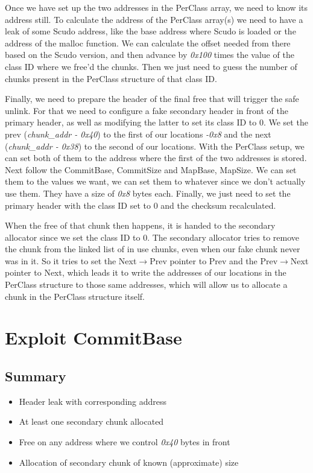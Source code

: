 \documentclass[a4paper,11pt,oneside]{report}
\begin{document}
Once we have set up the two addresses in the PerClass array, we need to know its address
still. To calculate the address of the PerClass array(s) we need to have a leak of some
Scudo address, like the base address where Scudo is loaded or the address of the malloc
function. We can calculate the offset needed from there based on the Scudo version, and
then advance by \emph{0x100} times the value of the class ID where we free'd the
chunks. Then we just need to guess the number of chunks present in the PerClass structure
of that class ID.

Finally, we need to prepare the header of the final free that will trigger the safe
unlink. For that we need to configure a fake secondary header in front of the primary
header, as well as modifying the latter to set its class ID to 0. We set the prev
(\emph{chunk\_addr - 0x40}) to the first of our locations \emph{-0x8} and the next
(\emph{chunk\_addr - 0x38}) to the second of our locations. With the PerClass setup, we
can set both of them to the address where the first of the two addresses is stored.  Next
follow the CommitBase, CommitSize and MapBase, MapSize. We can set them to the values we
want, we can set them to whatever since we don't actually use them. They have a size of
\emph{0x8} bytes each.  Finally, we just need to set the primary header with the class ID
set to 0 and the checksum recalculated.

When the free of that chunk then happens, it is handed to the secondary allocator since we
set the class ID to 0. The secondary allocator tries to remove the chunk from the linked
list of in use chunks, even when our fake chunk never was in it. So it tries to set the
Next$\rightarrow$Prev pointer to Prev and the Prev$\rightarrow$Next pointer to Next, which leads it to write the
addresses of our locations in the PerClass structure to those same addresses, which will
allow us to allocate a chunk in the PerClass structure itself.



\section{Exploit CommitBase}

\subsection{Summary}

\begin{itemize}
\item Header leak with corresponding address
\item At least one secondary chunk allocated
\item Free on any address where we control \emph{0x40} bytes in front
\item Allocation of secondary chunk of known (approximate) size
\end{itemize}
\end{document}
